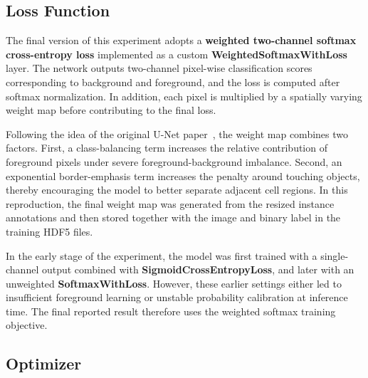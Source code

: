 \documentclass[11pt]{article}
\begin{document}
\subsection{Loss Function}

The final version of this experiment adopts a \textbf{weighted two-channel softmax cross-entropy loss} implemented as a custom \textbf{WeightedSoftmaxWithLoss} layer. The network outputs two-channel pixel-wise classification scores corresponding to background and foreground, and the loss is computed after softmax normalization. In addition, each pixel is multiplied by a spatially varying weight map before contributing to the final loss.

Following the idea of the original U-Net paper~\cite{ronneberger2015u}, the weight map combines two factors. First, a class-balancing term increases the relative contribution of foreground pixels under severe foreground-background imbalance. Second, an exponential border-emphasis term increases the penalty around touching objects, thereby encouraging the model to better separate adjacent cell regions. In this reproduction, the final weight map was generated from the resized instance annotations and then stored together with the image and binary label in the training HDF5 files.

In the early stage of the experiment, the model was first trained with a single-channel output combined with \textbf{SigmoidCrossEntropyLoss}, and later with an unweighted \textbf{SoftmaxWithLoss}. However, these earlier settings either led to insufficient foreground learning or unstable probability calibration at inference time. The final reported result therefore uses the weighted softmax training objective.

\subsection{Optimizer}
\end{document}
